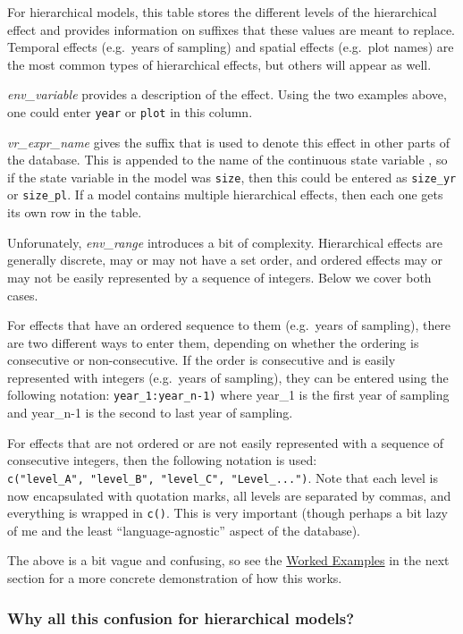 \documentclass[]{article}
\begin{document}
For hierarchical models, this table stores the different levels of the
hierarchical effect and provides information on suffixes that these
values are meant to replace. Temporal effects (e.g.~years of sampling)
and spatial effects (e.g.~plot names) are the most common types of
hierarchical effects, but others will appear as well.

\emph{env\_variable} provides a description of the effect. Using the two
examples above, one could enter \texttt{year} or \texttt{plot} in this
column.

\emph{vr\_expr\_name} gives the suffix that is used to denote this
effect in other parts of the database. This is appended to the name of
the continuous state variable , so if the state variable in the model
was \texttt{size}, then this could be entered as \texttt{size\_yr} or
\texttt{size\_pl}. If a model contains multiple hierarchical effects,
then each one gets its own row in the table.

Unforunately, \emph{env\_range} introduces a bit of complexity.
Hierarchical effects are generally discrete, may or may not have a set
order, and ordered effects may or may not be easily represented by a
sequence of integers. Below we cover both cases.

For effects that have an ordered sequence to them (e.g.~years of
sampling), there are two different ways to enter them, depending on
whether the ordering is consecutive or non-consecutive. If the order is
consecutive and is easily represented with integers (e.g.~years of
sampling), they can be entered using the following notation:
\texttt{year\_1:year\_n-1)} where year\_1 is the first year of sampling
and year\_n-1 is the second to last year of sampling.

For effects that are not ordered or are not easily represented with a
sequence of consecutive integers, then the following notation is used:
\texttt{c("level\_A",\ "level\_B",\ "level\_C",\ "Level\_...")}. Note
that each level is now encapsulated with quotation marks, all levels are
separated by commas, and everything is wrapped in \texttt{c()}. This is
very important (though perhaps a bit lazy of me and the least
``language-agnostic'' aspect of the database).

The above is a bit vague and confusing, so see the
\protect\hyperlink{examples}{Worked Examples} in the next section for a
more concrete demonstration of how this works.

\subsubsection{Why all this confusion for hierarchical
models?}\label{why-all-this-confusion-for-hierarchical-models}
\end{document}
